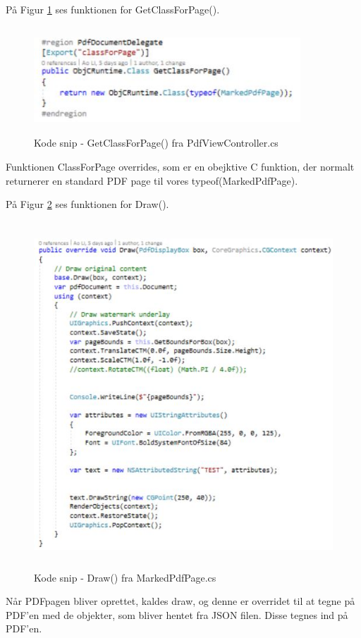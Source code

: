 \clearpage

På Figur \ref{fig:ClassPage} ses funktionen for GetClassForPage().
\begin{figure}[H] %
	\centering
	\includegraphics[height=4cm, width=10cm]{../ArkitekturDesign/Design/RegisterPDF/ClassPage}
	\caption{Kode snip - GetClassForPage() fra PdfViewController.cs}
	\label{fig:ClassPage}
\end{figure}
Funktionen ClassForPage overrides, som er en obejktive C funktion, der normalt returnerer en standard PDF page til vores typeof(MarkedPdfPage).

På Figur \ref{fig:Draw} ses funktionen for Draw().
\begin{figure}[H] %
	\centering
	\includegraphics[height=13cm, width=15cm]{../ArkitekturDesign/Design/RegisterPDF/Draw}
	\caption{Kode snip - Draw() fra MarkedPdfPage.cs}
	\label{fig:Draw}
\end{figure}
Når PDFpagen bliver oprettet, kaldes draw, og denne er overridet til at tegne på PDF'en med de objekter, som bliver hentet fra JSON filen. Disse tegnes ind på PDF'en.

